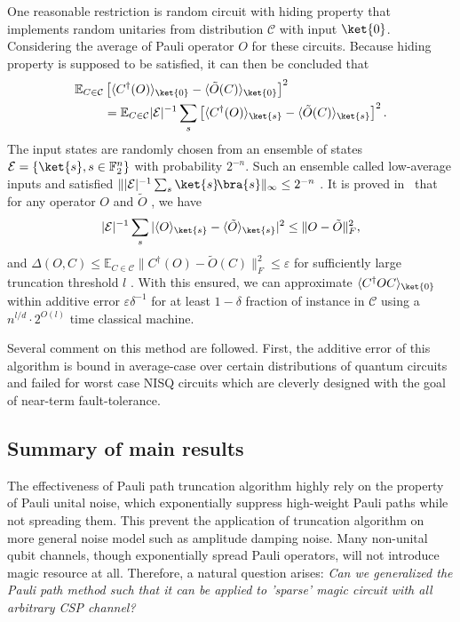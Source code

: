 \documentclass[aps,%
twocolumn,%
floatfix,%
pra,%
amsfonts,%
longbibliography,%
groupedaddress,%
superscriptaddress]{revtex4-2}%
\newcommand{\1}{\mathbbm{1}}
\begin{document}
One reasonable restriction is random circuit with hiding property that implements random unitaries from distribution $\mathcal{C}$ with input $\ket{0}$. Considering the average of Pauli operator $O$ for these circuits. Because hiding property is supposed to be satisfied, it can then be concluded that
\begin{align}
    \mathbb{E}_{C \in \mathcal{C}}&\left[\langle C^\dagger (O) \rangle_{\ket{0}} -  \langle \tilde O(C)\rangle_{\ket{0}}\right]^2 \notag \\
    &= \mathbb{E}_{C \in \mathcal{C}}|\mathcal{E}|^{-1}\sum_s \left[\langle C^\dagger (O)  \rangle_{\ket{s}} -  \langle \tilde O(C)\rangle_{\ket{s}}\right]^2 .
\end{align}
The input states are randomly chosen from an ensemble of states $\mathcal{E} = \{\ket{s},s \in \mathbb{F}_2^n\}$ with probability $2^{-n}$. Such an ensemble called low-average inputs and satisfied $\||\mathcal{E}|^{-1} \sum_{s} \ket{s}\!\bra{s}\|_\infty \leq 2^{-n}$ . It is proved in~\cite{schuster2024polynomial} that for any operator $O$ and $\tilde O$ , we have
\begin{align}
    |\mathcal{E}|^{-1}\sum_{s}|\langle O\rangle_{\ket{s}} - \langle \tilde O\rangle_{\ket{s}}|^2\leq \|O - \tilde O\|_F^2,
\end{align}
and $\Delta(O,C)\leq \mathbb{E}_{C \in \mathcal{C}} \|C^\dagger (O) - \tilde O(C)\|_F^2 \leq \varepsilon$ for sufficiently large truncation threshold $l$ . With this ensured, we can approximate $\langle C^\dagger O C \rangle_{\ket{0}}$ within additive error $\varepsilon \delta^{-1}$ for at least $1 - \delta$ fraction of instance in $\mathcal{C}$ using a $n^{l/d} \cdot 2^{O(l)}$ time classical machine. 

Several comment on this method are followed. First, the additive error of this algorithm is bound in average-case over certain distributions of quantum circuits and failed for worst case NISQ circuits which are cleverly designed with the goal of near-term fault-tolerance. 


\subsection{Summary of main results}
The effectiveness of Pauli path truncation algorithm highly rely on the property of Pauli unital noise, which exponentially suppress high-weight Pauli paths while not spreading them. 
This prevent the application of truncation algorithm on more general noise model such as amplitude damping noise.
Many non-unital qubit channels, though exponentially spread Pauli operators, will not introduce magic resource at all. 
Therefore, a natural question arises:
\textit{Can we generalized the Pauli path method such that it can be applied to 'sparse' magic circuit with all arbitrary CSP channel?}
\end{document}
